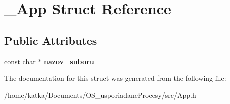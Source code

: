 \hypertarget{struct__App}{}\section{\+\_\+\+App Struct Reference}
\label{struct__App}
\subsection*{Public Attributes}
\begin{DoxyCompactItemize}
\item 
const char $\ast$ {\bfseries nazov\+\_\+suboru}\hypertarget{struct__App_a75b8ceb6c793d2eafac8395c13fc0b0a}{}\label{struct__App_a75b8ceb6c793d2eafac8395c13fc0b0a}

\end{DoxyCompactItemize}


The documentation for this struct was generated from the following file\+:\begin{DoxyCompactItemize}
\item 
/home/katka/\+Documents/\+O\+S\+\_\+usporiadane\+Procesy/src/App.\+h\end{DoxyCompactItemize}
